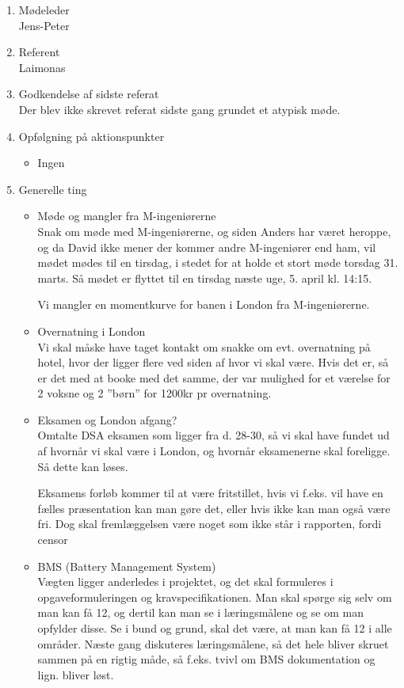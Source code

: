 	\begin{enumerate}
		\itemsep 0.3em 
		\item Mødeleder\\
			Jens-Peter
		\item Referent\\
			Laimonas
		\item Godkendelse af sidste referat\\
			Der blev ikke skrevet referat sidste gang grundet et atypisk møde. 

		\item Opfølgning på aktionspunkter
		\begin{itemize}
			\itemsep 0.3em 
			\item Ingen
		\end{itemize}
		
		\item Generelle ting
		\begin{itemize}
			\itemsep 0.3em 
			\item Møde og mangler fra M-ingeniørerne\\
			Snak om møde med M-ingeniørerne, og siden Anders har været heroppe, og da David ikke mener der kommer andre M-ingeniører end ham, vil mødet mødes til en tirsdag, i stedet for at holde et stort møde torsdag 31. marts. 
			Så mødet er flyttet til en tirsdag næste uge, 5. april kl. 14:15. 
			
			Vi mangler en momentkurve for banen i London fra M-ingeniørerne.
			
			\item Overnatning i London\\
			Vi skal måske have taget kontakt om snakke om evt. overnatning på hotel, hvor der ligger flere ved siden af hvor vi skal være. Hvis det er, så er det med at booke med det samme, der var mulighed for et værelse for 2 voksne og 2 ”børn” for 1200kr pr overnatning.
			
			\item Eksamen og London afgang?\\
			Omtalte DSA eksamen som ligger fra d. 28-30, så vi skal have fundet ud af hvornår vi skal være i London, og hvornår eksamenerne skal foreligge. Så dette kan løses. 
			
			Eksamens forløb kommer til at være fritstillet, hvis vi f.eks. vil have en fælles præsentation kan man gøre det, eller hvis ikke kan man også være fri. Dog skal fremlæggelsen være noget som ikke står i rapporten, fordi censor 
			
			\item BMS (Battery Management System)\\
			Vægten ligger anderledes i projektet, og det skal formuleres i opgaveformuleringen og kravspecifikationen.
			Man skal spørge sig selv om man kan få 12, og dertil kan man se i læringsmålene og se om man opfylder disse. Se i bund og grund, skal det være, at man kan få 12 i alle områder. 
			Næste gang diskuteres læringsmålene, så det hele bliver skruet sammen på en rigtig måde, så f.eks. tvivl om BMS dokumentation og lign. bliver løst.
			

\end{itemize}
\end{enumerate}
